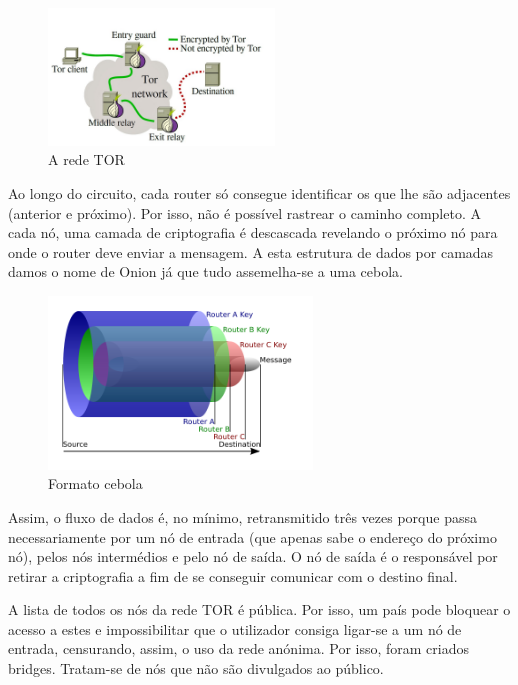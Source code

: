 \documentclass{llncs}
\begin{document}
\pagebreak

\begin{figure}
\begin{center}
\includegraphics[width=6cm]{tor1.jpg}
\caption{\label{fig:3}A rede TOR}
\end{center}
\end{figure}

\par Ao longo do circuito, cada router só consegue identificar os que lhe são adjacentes (anterior e próximo). Por isso, não é possível rastrear o caminho completo. A cada nó, uma camada de criptografia é descascada revelando o próximo nó para onde o router deve enviar a mensagem. A esta estrutura de dados por camadas damos o nome de Onion já que tudo assemelha-se a uma cebola. \cite{FM}

\begin{figure}
\begin{center}
\includegraphics[width=7cm]{tor2.png}
\caption{\label{fig:4}Formato cebola}
\end{center}
\end{figure}

\par Assim, o fluxo de dados é, no mínimo, retransmitido três vezes porque passa necessariamente por um nó de entrada (que apenas sabe o endereço do próximo nó), pelos nós intermédios e pelo nó de saída. 
O nó de saída é o responsável por retirar a criptografia a fim de se conseguir comunicar com o destino final. \cite{Kumm}

\par A lista de todos os nós da rede TOR é pública. Por isso, um país pode bloquear o acesso a estes e impossibilitar que o utilizador consiga ligar-se a um nó de entrada, censurando, assim, o uso da rede anónima. Por isso, foram criados bridges. Tratam-se de nós que não são divulgados ao público. \cite{Kumm}
\end{document}
